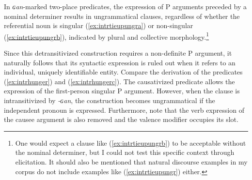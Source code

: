 \documentclass[12pt]{article}
\begin{document}
 In \textit{ɢan}-marked two-place predicates, the expression of P arguments preceded by a nominal determiner results in ungrammatical clauses, regardless of whether the referential noun is singular (\ref{ex:intrtieupungra}) or non-singular (\ref{ex:intrtieupungrb}), indicated by plural and collective morphology.\footnote{One would expect a clause like (\ref{ex:intrtieupungrb}) to  be acceptable without the nominal determiner, but I could not test this specific context through elicitation. It should also be mentioned that natural discourse examples in my corpus do not include examples like (\ref{ex:intrtieupungr}) either.}   

\begin{exe}
\ex\label{ex:intrtieupungr}
\begin{xlist}
	\label{ex:intrtieupungra}	
	
\label{ex:intrtieupungrb}	
\end{xlist}
\end{exe}

Since this detransitivized construction requires a non-definite P argument, it naturally follows that its syntactic expression is ruled out when it refers to an individual, uniquely identifiable entity. Compare the derivation of the predicates (\ref{ex:intrhunger}) and (\ref{ex:intrhungerc}). The causativized predicate  allows the expression of the first-person singular P argument. However, when the clause is intransitivized by \textit{-ɢan}, the construction becomes ungrammatical if the independent pronoun is expressed. Furthermore, note that the verb expression of the causee argument is also removed and the valence modifier occupies its slot. 
\end{document}
